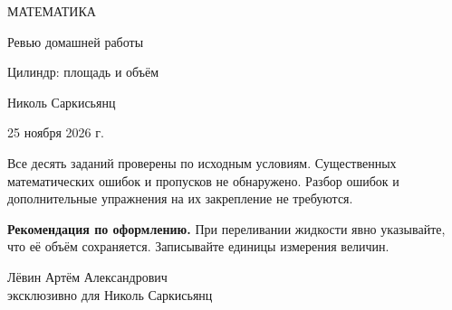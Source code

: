 \documentclass[a4paper,12pt]{article}
\begin{document}
\begin{center}
\vspace*{23mm}
{\Large\color{darkaccent} МАТЕМАТИКА\par}
\vspace{15mm}
{\huge Ревью домашней работы\par}
\vspace{11mm}
{\LARGE\color{accent} Цилиндр: площадь и объём\par}
\vspace{19mm}
{\large Николь Саркисьянц\par}
\vspace{6mm}
25 ноября 2026 г.
\vspace{17mm}
\end{center}
\par
\medskip
Все десять заданий проверены по исходным условиям. Существенных математических ошибок и пропусков не обнаружено. Разбор ошибок и дополнительные упражнения на их закрепление не требуются.
\par\medskip
\noindent\textbf{Рекомендация по оформлению.} При переливании жидкости явно указывайте, что её объём сохраняется. Записывайте единицы измерения величин.
\vfill
\begin{center}
{\small\color{textgray} Лёвин Артём Александрович\\[2mm]
эксклюзивно для Николь Саркисьянц}\par
\vspace{13mm}
\end{center}
\end{document}
